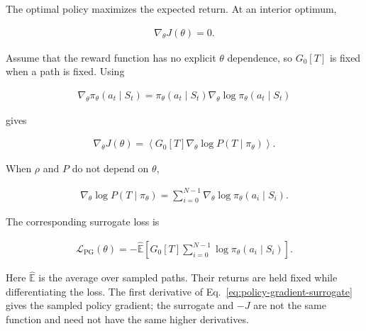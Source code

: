 \documentclass[11pt]{article}
\newcommand{\E}{\mathbb{E}}
\begin{document}
The optimal policy maximizes the expected return.  At an interior optimum,

\begin{equation}
    \begin{split}
        \nabla_\theta J(\theta)=0.
    \end{split}
    \label{eq:stationary-policy}
\end{equation}

Assume that the reward function has no explicit \(\theta\) dependence, so
\(G_0[T]\) is fixed when a path is fixed.  Using

\begin{equation}
    \begin{split}
        \nabla_\theta\pi_\theta(a_t\mid S_t)
        =\pi_\theta(a_t\mid S_t)\nabla_\theta\log\pi_\theta(a_t\mid S_t)
    \end{split}
    \label{eq:log-derivative}
\end{equation}

gives

\begin{equation}
    \begin{split}
        \nabla_\theta J(\theta)
        =\left\langle G_0[T]\nabla_\theta
        \log P(T\mid\pi_\theta)\right\rangle.
    \end{split}
    \label{eq:policy-gradient-path}
\end{equation}

When \(\rho\) and \(P\) do not depend on \(\theta\),

\begin{equation}
    \begin{split}
        \nabla_\theta\log P(T\mid\pi_\theta)
        =\sum_{i=0}^{N-1}\nabla_\theta\log\pi_\theta(a_i\mid S_i).
    \end{split}
    \label{eq:path-score}
\end{equation}

The corresponding surrogate loss is

\begin{equation}
    \begin{split}
        \mathcal L_{\mathrm{PG}}(\theta)
        =-\widehat{\E}\left[
        G_0[T]\sum_{i=0}^{N-1}
        \log\pi_\theta(a_i\mid S_i)\right].
    \end{split}
    \label{eq:policy-gradient-surrogate}
\end{equation}

Here \(\widehat{\E}\) is the average over sampled paths.  Their returns are
held fixed while differentiating the loss.  The first derivative of
Eq.~\eqref{eq:policy-gradient-surrogate} gives the sampled policy gradient;
the surrogate and \(-J\) are not the same function and need not have the same
higher derivatives.
\end{document}

